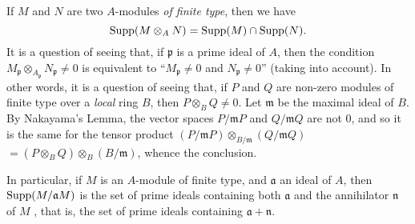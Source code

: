 \begin{env}[1.7.5]
\label{0.1.7.5}
If $M$ and $N$ are two $A$-modules \emph{of finite type}, then we have
\[
  {\mathop{\mathrm{Supp}}\nolimits}(M\otimes_A N)={\mathop{\mathrm{Supp}}\nolimits}(M)\cap{\mathop{\mathrm{Supp}}\nolimits}(N).
\]
It is a question of seeing that, if $\mathfrak{p}$ is a prime ideal of $A$, then the condition $M_\mathfrak{p}\otimes_{A_\mathfrak{p}}N_\mathfrak{p}\neq 0$ is equivalent to ``$M_\mathfrak{p}\neq 0$ and $N_\mathfrak{p}\neq 0$'' (taking  into account).
In other words, it is a question of seeing that, if $P$ and $Q$ are non-zero modules of finite type over a \emph{local} ring $B$, then $P\otimes_B Q\neq 0$. Let $\mathfrak{m}$ be the maximal ideal of $B$.
By Nakayama's Lemma, the vector spaces $P/\mathfrak{m}P$ and $Q/\mathfrak{m}Q$ are not $0$, and so it is the same for the tensor product $(P/\mathfrak{m}P)\otimes_{B/\mathfrak{m}}(Q/\mathfrak{m}Q)$
$=(P\otimes_B Q)\otimes_B(B/\mathfrak{m})$, whence the conclusion.

In particular, if $M$ is an $A$-module of finite type, and $\mathfrak{a}$ an ideal of $A$, then ${\mathop{\mathrm{Supp}}\nolimits}(M/\mathfrak{a}M)$ is the set of prime ideals containing both $\mathfrak{a}$ and the annihilator $\mathfrak{n}$ of $M$ , that is, the set of prime ideals containing $\mathfrak{a}+\mathfrak{n}$.
\end{env}

